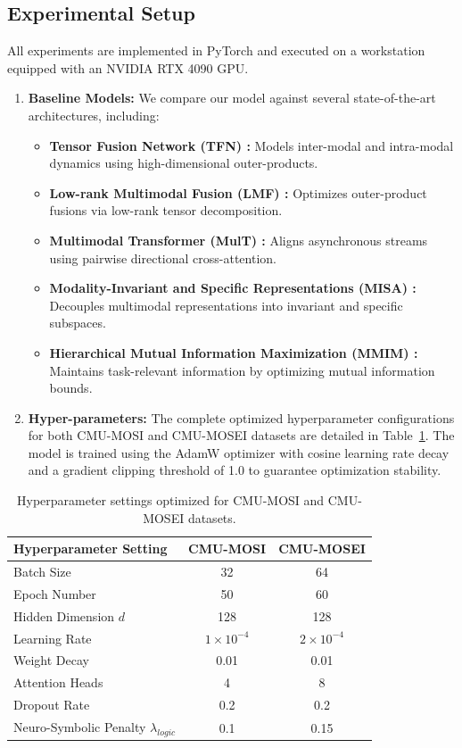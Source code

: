 \documentclass[sn-mathphys,Numbered]{sn-jnl}
\theoremstyle{thmstyleone}
\theoremstyle{thmstyletwo}
\theoremstyle{thmstylethree}
\begin{document}
\subsection{Experimental Setup}\label{subsec:setup}
All experiments are implemented in PyTorch and executed on a workstation equipped with an NVIDIA RTX 4090 GPU.
\begin{enumerate}
    \item \textbf{Baseline Models:} We compare our model against several state-of-the-art architectures, including:
    \begin{itemize}
        \item \textbf{Tensor Fusion Network (TFN) \cite{zadeh2017tensor}:} Models inter-modal and intra-modal dynamics using high-dimensional outer-products.
        \item \textbf{Low-rank Multimodal Fusion (LMF) \cite{liu2018efficient}:} Optimizes outer-product fusions via low-rank tensor decomposition.
        \item \textbf{Multimodal Transformer (MulT) \cite{tsai2019multimodal}:} Aligns asynchronous streams using pairwise directional cross-attention.
        \item \textbf{Modality-Invariant and Specific Representations (MISA) \cite{hazarika2020misa}:} Decouples multimodal representations into invariant and specific subspaces.
        \item \textbf{Hierarchical Mutual Information Maximization (MMIM) \cite{han2021improving}:} Maintains task-relevant information by optimizing mutual information bounds.
    \end{itemize}
    \item \textbf{Hyper-parameters:} The complete optimized hyperparameter configurations for both CMU-MOSI and CMU-MOSEI datasets are detailed in Table~\ref{tab:hyperparams}. The model is trained using the AdamW optimizer with cosine learning rate decay and a gradient clipping threshold of 1.0 to guarantee optimization stability.
\end{enumerate}

\begin{table}[htbp]
\centering
\caption{Hyperparameter settings optimized for CMU-MOSI and CMU-MOSEI datasets.}
\label{tab:hyperparams}
\begin{tabular}{lcc}
\toprule
\textbf{Hyperparameter Setting} & \textbf{CMU-MOSI} & \textbf{CMU-MOSEI} \\
\midrule
Batch Size & 32 & 64 \\
\midrule
Epoch Number & 50 & 60 \\
\midrule
Hidden Dimension $d$ & 128 & 128 \\
\midrule
Learning Rate & $1 \times 10^{-4}$ & $2 \times 10^{-4}$ \\
\midrule
Weight Decay & 0.01 & 0.01 \\
\midrule
Attention Heads & 4 & 8 \\
\midrule
Dropout Rate & 0.2 & 0.2 \\
\midrule
Neuro-Symbolic Penalty $\lambda_{logic}$ & 0.1 & 0.15 \\
\bottomrule
\end{tabular}
\end{table}
\end{document}
